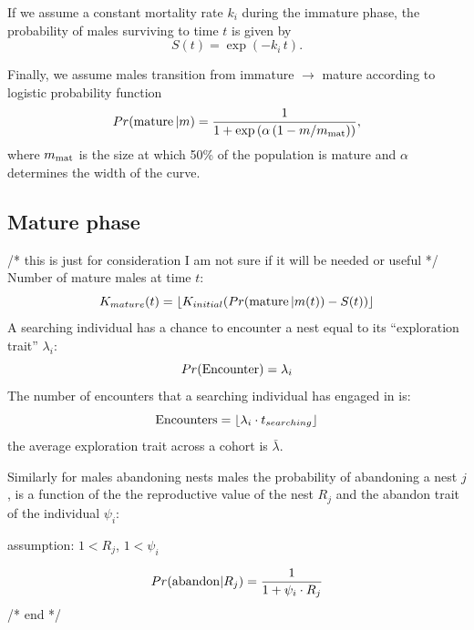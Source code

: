 \documentclass[a4paper,11pt]{article}
\begin{document}
If we assume a constant mortality rate $k_i$ during the immature phase, the probability of males surviving to time $t$ is given by
\begin{equation} \label{eq:surv_immature}
S(t) = \exp(-k_i \, t).
\end{equation}

Finally, we assume males transition from immature $\rightarrow$ mature according to logistic probability function
\begin{equation}\label{eq:allocation}
Pr({\rm mature} \, | m) = \frac1{1 + \exp\left(\alpha \left(1 - m / m_{\rm mat}\right)\right)},
\end{equation}
where $m_{\rm mat}$ is the size at which 50\% of the population is mature and $\alpha$ determines the width of the curve.

\subsection{Mature phase}

/* this is just for consideration I am not sure if it will be needed or useful */\\
Number of mature males at time $t$:
\begin{equation} \label{eq:num_mature}
    K_{mature}(t) = \lfloor{K_{initial}(Pr({\rm mature} \, | m(t)) - S(t))}\rfloor
\end{equation}
A searching individual has a chance to encounter a nest equal to its ``exploration trait'' $\lambda_i$:
\begin{equation} \label{eq:encounter probability}
    Pr({\rm Encounter}) = \lambda_i
\end{equation}
The number of encounters that a searching individual has engaged in is:
\begin{equation} \label{eq:encounter rate}
    {\rm Encounters} = \lfloor\lambda_i \cdot t_{searching}\rfloor
\end{equation}
the average exploration trait across a cohort is $\bar\lambda$.

Similarly for males abandoning nests males the probability of abandoning a nest $j$, is a function of the  the reproductive value of the nest $R_j$ and the abandon trait of the individual $\psi_i$: 

assumption: $1 < R_j$,  $1 < \psi_i$

\begin{equation} \label{eq:abandon}
    Pr({\rm abandon} | R_j ) = \frac{1}{1 + \psi_i \cdot R_j}
\end{equation}
/* end */
\end{document}
